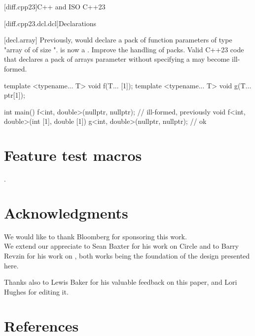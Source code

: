 \documentclass{wg21}
\begin{document}
\begin{addedblock}

[diff.cpp23]{C++ and ISO C++23}

[diff.cpp23.dcl.dcl]{Declarations}

[decl.array]
\change
Previously,  would declare a pack of function parameters of type "array of  of size ".
 is now a .
\rationale
Improve the handling of packs.
\effect
Valid C++23 code that declares a
pack of arrays parameter without specifying a  may become ill-formed.

\begin{codeblock}
template <typename... T>
void f(T... [1]);
template <typename... T>
void g(T... ptr[1]);

int main() {
    f<int, double>(nullptr, nullptr); // ill-formed, previously void f<int, double>(int [1], double [1])
    g<int, double>(nullptr, nullptr); // ok
}
\end{codeblock}

\begin{colorblock}

\end{colorblock}

\end{addedblock}

\section{Feature test macros}

.


\section{Acknowledgments}

We would like to thank Bloomberg for sponsoring this work.\\

We extend our appreciate to Sean Baxter for his work on Circle and to Barry Revzin  for his work on , both works being the foundation of the design presented here.

Thanks also to Lewis Baker for his valuable feedback on this paper, and Lori Hughes for editing it.

\section{References} %
\end{document}
